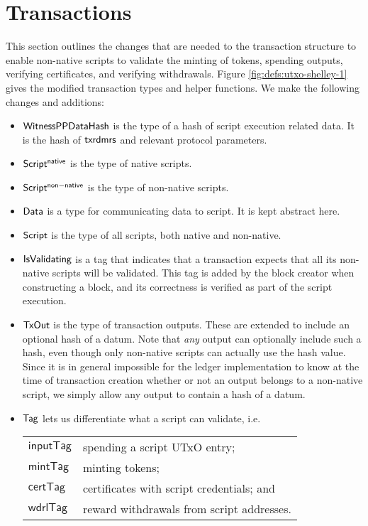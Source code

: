 \section{Transactions}
\label{sec:transactions}

This section outlines the changes that are needed to the transaction
structure to enable non-native scripts to validate
the minting of tokens, spending outputs, verifying certificates, and
verifying withdrawals.
%
Figure \ref{fig:defs:utxo-shelley-1} gives the modified transaction types and helper functions.
We make the following changes and additions:

\begin{itemize}
  \item $\mathsf{WitnessPPDataHash}$ is the type of a hash of script execution
  related data. It is the hash of $\mathsf{txrdmrs}$ and relevant protocol parameters.

  \item $\mathsf{Script^{native}}$ is the type of native scripts.

  \item $\mathsf{Script^{non-native}}$ is the type of non-native scripts.

  \item $\mathsf{Data}$ is a type for communicating data to script.  It is kept abstract here.

  \item $\mathsf{Script}$ is the type of all scripts, both native and non-native.

  \item $\mathsf{IsValidating}$ is a tag that indicates that a transaction
  expects that all its non-native scripts will be validated.
  This tag is added by the block creator when
  constructing a block, and its correctness is verified as part of the script execution.

  \item $\mathsf{TxOut}$ is the type of transaction outputs. These are extended to include
  an optional hash of a datum. Note that \emph{any} output can
  optionally include such a hash, even though only non-native scripts
  can actually use the hash value. Since it is in general impossible for the ledger implementation to
  know at the time of transaction creation whether or not an output belongs to a non-native
  script, we simply allow any output to contain a hash of a datum.

  \item $\mathsf{Tag}$ lets us differentiate what a script
  can validate, i.e. \\
  \begin{tabular}{l@{~to validate~}l}
  $\mathsf{inputTag}$ & spending a script UTxO entry; \\
  $\mathsf{mintTag}$ & minting tokens; \\
  $\mathsf{certTag}$  & certificates with script credentials; and  \\
  $\mathsf{wdrlTag}$ & reward withdrawals from script addresses.
  \end{tabular}


\end{itemize}
